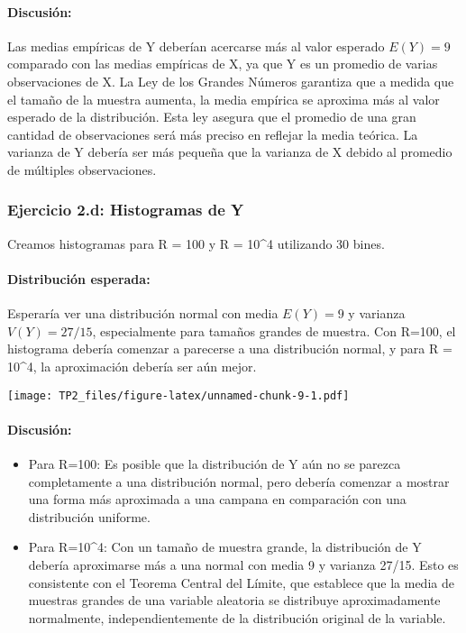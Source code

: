\documentclass[
]{article}
\providecommand{\tightlist}{%
  \setlength{\itemsep}{0pt}\setlength{\parskip}{0pt}}
\begin{document}
\paragraph{Discusión:}\label{discusiuxf3n-1}

Las medias empíricas de Y deberían acercarse más al valor esperado
\(E(Y)=9\) comparado con las medias empíricas de X, ya que Y es un
promedio de varias observaciones de X. La Ley de los Grandes Números
garantiza que a medida que el tamaño de la muestra aumenta, la media
empírica se aproxima más al valor esperado de la distribución. Esta ley
asegura que el promedio de una gran cantidad de observaciones será más
preciso en reflejar la media teórica. La varianza de Y debería ser más
pequeña que la varianza de X debido al promedio de múltiples
observaciones.

\subsubsection{Ejercicio 2.d: Histogramas de
Y}\label{ejercicio-2.d-histogramas-de-y}

Creamos histogramas para R = 100 y R = 10\^{}4 utilizando 30 bines.

\paragraph{Distribución esperada:}\label{distribuciuxf3n-esperada-1}

Esperaría ver una distribución normal con media \(E(Y) = 9\) y varianza
\(V(Y) = 27/15\), especialmente para tamaños grandes de muestra. Con
R=100, el histograma debería comenzar a parecerse a una distribución
normal, y para R = 10\^{}4, la aproximación debería ser aún mejor.

\texttt{[image: TP2\_files/figure-latex/unnamed-chunk-9-1.pdf]}

\paragraph{Discusión:}\label{discusiuxf3n-2}

\begin{itemize}
\tightlist
\item
  Para R=100: Es posible que la distribución de Y aún no se parezca
  completamente a una distribución normal, pero debería comenzar a
  mostrar una forma más aproximada a una campana en comparación con una
  distribución uniforme.
\item
  Para R=10\^{}4: Con un tamaño de muestra grande, la distribución de Y
  debería aproximarse más a una normal con media 9 y varianza 27/15.
  Esto es consistente con el Teorema Central del Límite, que establece
  que la media de muestras grandes de una variable aleatoria se
  distribuye aproximadamente normalmente, independientemente de la
  distribución original de la variable.
\end{itemize}
\end{document}
